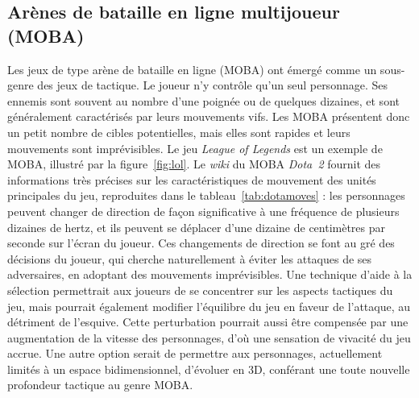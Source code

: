 	\subsection{Arènes de bataille en ligne multijoueur (MOBA)}
	\label{sub:moba}
	Les jeux de type arène de bataille en ligne (MOBA) ont émergé comme un sous-genre des jeux de tactique. Le joueur n'y contrôle qu'un seul personnage. Ses ennemis sont souvent au nombre d'une poignée ou de quelques dizaines, et sont généralement caractérisés par leurs mouvements vifs. Les MOBA présentent donc un petit nombre de cibles potentielles, mais elles sont rapides et leurs mouvements sont imprévisibles. Le jeu \emph{League of Legends} est un exemple de MOBA, illustré par la figure~\ref{fig:lol}. Le \emph{wiki} du MOBA \emph{Dota~2} fournit des informations très précises sur les caractéristiques de mouvement des unités principales du jeu,\footnotemark{} reproduites dans le tableau~\ref{tab:dotamoves} : les personnages peuvent changer de direction de façon significative à une fréquence de plusieurs dizaines de hertz, et ils peuvent se déplacer d'une dizaine de centimètres par seconde sur l'écran du joueur. Ces changements de direction se font au gré des décisions du joueur, qui cherche naturellement à éviter les attaques de ses adversaires, en adoptant des mouvements imprévisibles. Une technique d'aide à la sélection permettrait aux joueurs de se concentrer sur les aspects tactiques du jeu, mais pourrait également modifier l'équilibre du jeu en faveur de l'attaque, au détriment de l'esquive. Cette perturbation pourrait aussi être compensée par une augmentation de la vitesse des personnages, d'où une sensation de vivacité du jeu accrue. Une autre option serait de permettre aux personnages, actuellement limités à un espace bidimensionnel, d'évoluer en 3D, conférant une toute nouvelle profondeur tactique au genre MOBA.
	
	
